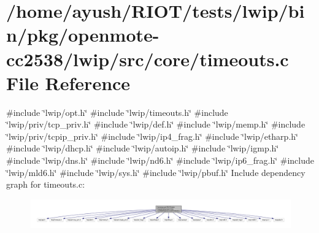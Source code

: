 \hypertarget{openmote-cc2538_2lwip_2src_2core_2timeouts_8c}{}\section{/home/ayush/\+R\+I\+O\+T/tests/lwip/bin/pkg/openmote-\/cc2538/lwip/src/core/timeouts.c File Reference}
\label{openmote-cc2538_2lwip_2src_2core_2timeouts_8c}
{\ttfamily \#include \char`\"{}lwip/opt.\+h\char`\"{}}\newline
{\ttfamily \#include \char`\"{}lwip/timeouts.\+h\char`\"{}}\newline
{\ttfamily \#include \char`\"{}lwip/priv/tcp\+\_\+priv.\+h\char`\"{}}\newline
{\ttfamily \#include \char`\"{}lwip/def.\+h\char`\"{}}\newline
{\ttfamily \#include \char`\"{}lwip/memp.\+h\char`\"{}}\newline
{\ttfamily \#include \char`\"{}lwip/priv/tcpip\+\_\+priv.\+h\char`\"{}}\newline
{\ttfamily \#include \char`\"{}lwip/ip4\+\_\+frag.\+h\char`\"{}}\newline
{\ttfamily \#include \char`\"{}lwip/etharp.\+h\char`\"{}}\newline
{\ttfamily \#include \char`\"{}lwip/dhcp.\+h\char`\"{}}\newline
{\ttfamily \#include \char`\"{}lwip/autoip.\+h\char`\"{}}\newline
{\ttfamily \#include \char`\"{}lwip/igmp.\+h\char`\"{}}\newline
{\ttfamily \#include \char`\"{}lwip/dns.\+h\char`\"{}}\newline
{\ttfamily \#include \char`\"{}lwip/nd6.\+h\char`\"{}}\newline
{\ttfamily \#include \char`\"{}lwip/ip6\+\_\+frag.\+h\char`\"{}}\newline
{\ttfamily \#include \char`\"{}lwip/mld6.\+h\char`\"{}}\newline
{\ttfamily \#include \char`\"{}lwip/sys.\+h\char`\"{}}\newline
{\ttfamily \#include \char`\"{}lwip/pbuf.\+h\char`\"{}}\newline
Include dependency graph for timeouts.\+c\+:
\nopagebreak
\begin{figure}[H]
\begin{center}
\leavevmode
\includegraphics[width=350pt]{openmote-cc2538_2lwip_2src_2core_2timeouts_8c__incl}
\end{center}
\end{figure}
